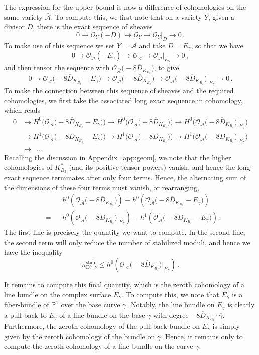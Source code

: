 \documentclass[a4paper,12pt]{article}
\numberwithin{equation}{section}
\newcommand{\mc}{\mathcal}
\newcommand{\mbb}{\mathbb}
\newcommand{\be}{\begin{equation}}
\newcommand{\ee}{\end{equation}}
\newcommand{\fthb}{B_3}				%
\newcommand{\canb}[1]{K_{#1}}			%
\newcommand{\candl}{\overline{D}_{K_{B_3}}}	%
\newcommand{\asl}{\overline{\mc{A}}}	%
\newcommand{\crv}{\gamma}			%
\newcommand{\crvl}{\overline{\gamma}}	%
\newcommand{\stbmod}[1]{n_{\mathrm{D7},{#1}}^\mathrm{stab.}}		%
\begin{document}
The expression for the upper bound is now a difference of cohomologies on the same variety $\asl$. To compute this, we first note that on a variety $Y$, given a divisor $D$, there is the exact sequence of sheaves
\be
0 \to \mc{O}_Y(-D) \to \mc{O}_Y \to  \mc{O}_Y|_D \to 0 \,.
\ee
To make use of this sequence we set $Y = \asl$ and take $D = E_\crv$, so that we have
\be
0 \to \mc{O}_{\asl}(-E_\crv) \to \mc{O}_{\asl} \to  \mc{O}_{\asl}|_{E_\crv} \to 0 \,,
\ee
and then tensor the sequence with $\mc{O}_{\asl}\big(-8\candl\big)$, to give
\be
0 \to \mc{O}_{\asl}\big(-8\candl-E_\crv\big) \to \mc{O}_{\asl}\big(-8\candl\big) \to \mc{O}_{\asl}\big(-8\candl\big)\big|_{E_\crv} \to 0 \,.
\ee
To make the connection between this sequence of sheaves and the required cohomologies, we first take the associated long exact sequence in cohomology, which reads
\be
\begin{aligned}
0 &\to H^0\Big(\mc{O}_{\asl}\big(-8\candl-E_\crv\big)\Big)
\to H^0\Big(\mc{O}_{\asl}\big(-8\candl\big)\Big)
\to H^0\Big(\mc{O}_{\asl}\big(-8\candl\big)\big|_{E_\crv}\Big)
\\
&\to H^1\Big(\mc{O}_{\asl}\big(-8\candl-E_\crv\big)\Big)
\to H^1\Big(\mc{O}_{\asl}\big(-8\candl\big)\Big)
\to H^1\Big(\mc{O}_{\asl}\big(-8\candl\big)\big|_{E_\crv}\Big)
\\
&\to ~~\ldots 
\end{aligned}
\ee
Recalling the discussion in Appendix~\ref{app:geom}, we note that the higher cohomologies of $\canb{\fthb}^*$ (and its positive tensor powers) vanish, and hence the long exact sequence terminates after only four terms. Hence, the alternating sum of the dimensions of these four terms must vanish, or rearranging,
\be
\begin{aligned}
&~ &&h^0\left(\mc{O}_{\asl}\big(-8\candl\big)\right) - h^0\left(\mc{O}_{\asl}\big(-8\candl-E_\crv\big) \right) \\
&= && h^0\left(\mc{O}_{\asl}\big(-8\candl\big)\big|_{E_\crv}\right) - h^1\left(\mc{O}_{\asl}\big(-8\candl-E_\crv\big) \right) \,.
\end{aligned}
\ee
The first line is precisely the quantity we want to compute. In the second line, the second term will only reduce the number of stabilized moduli, and hence we have the inequality
\be
\stbmod{\crv} \leq h^0\left(\mc{O}_{\asl}\big(-8\candl\big)\big|_{E_\crv}\right) \,.
\ee

It remains to compute this final quantity, which is the zeroth cohomology of a line bundle on the complex surface $E_\crv$. To compute this, we note that $E_\crv$ is a fiber-bundle of $\mbb{P}^1$ over the base curve $\crv$. Notably, the line bundle on $E_\crv$ is clearly a pull-back to $E_\crv$ of a line bundle on the base $\crv$ with degree $-8\candl \cdot \crvl$. Furthermore, the zeroth cohomology of the pull-back bundle on $E_\crv$ is simply given by the zeroth cohomology of the bundle on $\crv$. Hence, it remains only to compute the zeroth cohomology of a line bundle on the curve $\crv$.
\end{document}
